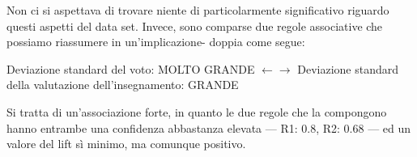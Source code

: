             

            Non ci si aspettava di trovare niente di particolarmente significativo riguardo questi aspetti del data set. Invece, sono comparse due regole associative che possiamo riassumere in un'implicazione- doppia come segue:

            \begin{center}
                Deviazione standard del voto: MOLTO GRANDE $\leftarrow \rightarrow$ Deviazione standard della valutazione dell'insegnamento: GRANDE
            \end{center}

            Si tratta di un'associazione forte, in quanto le due regole che la compongono hanno entrambe una confidenza abbastanza elevata --- R1: 0.8, R2: 0.68 --- ed un valore del lift sì minimo, ma comunque positivo. \\

